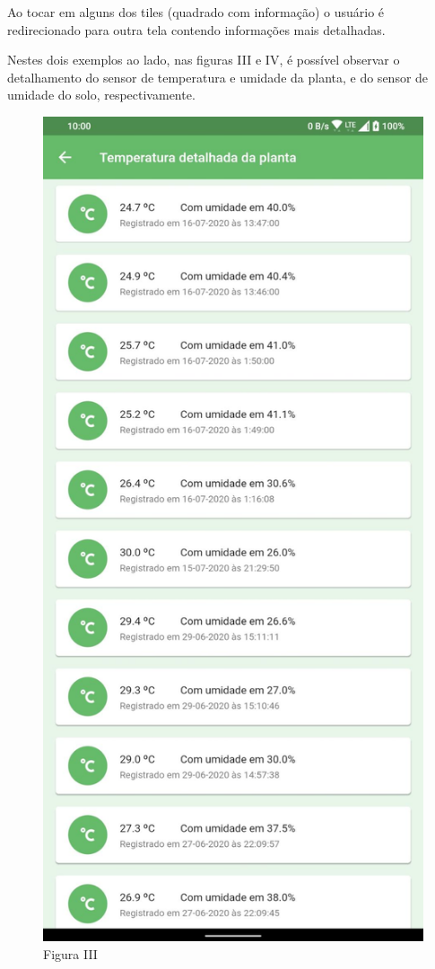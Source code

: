 \documentclass[eso]{bcc}
\begin{document}
Ao tocar em alguns dos tiles (quadrado com informação) o usuário é redirecionado para outra tela 
contendo informações mais detalhadas.

Nestes dois exemplos ao lado, nas figuras III e IV, é possível observar o detalhamento do sensor 
de temperatura e umidade da planta, e do sensor de umidade do solo, respectivamente.

\begin{figure}[htbp]
\centerline{\includegraphics[scale=.25]{Figuras/figura-iii.jpg}}
\caption{Figura III}\label{fig-iii}
\end{figure}
\end{document}

